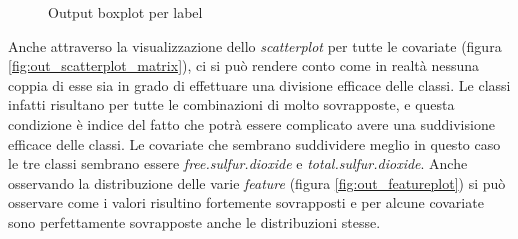     \vspace{1.4cm}
    \begin{figure}[h]
        \noindent{}
        \centering
        \caption{Output boxplot per label}
        \label{fig:out_boxplot_label_2}
    \end{figure}
    
    \newpage
    
    
    Anche attraverso la visualizzazione dello \textit{scatterplot} per tutte le covariate (figura \ref{fig:out_scatterplot_matrix}), ci si può rendere conto come in realtà nessuna coppia di esse sia in grado di effettuare una divisione efficace delle classi. Le classi infatti risultano per tutte le combinazioni di molto sovrapposte, e questa condizione è indice del fatto che potrà essere complicato avere una suddivisione efficace delle classi. Le covariate che sembrano suddividere meglio in questo caso le tre classi sembrano essere \textit{free.sulfur.dioxide} e \textit{total.sulfur.dioxide}. Anche osservando la distribuzione delle varie \textit{feature} (figura \ref{fig:out_featureplot}) si può osservare come i valori risultino fortemente sovrapposti e per alcune covariate sono perfettamente sovrapposte anche le distribuzioni stesse.
    

